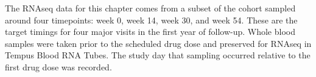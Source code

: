 %
%
%

%
The \gls{RNAseq} data for this chapter comes from a subset of the cohort sampled around four timepoints: week 0, week 14, week 30, and week 54.
These are the target timings for four major visits in the first year of follow-up.
Whole blood samples were taken prior to the scheduled drug dose and preserved for \gls{RNAseq} in Tempus Blood RNA Tubes.
The study day that sampling occurred relative to the first drug dose was recorded.

